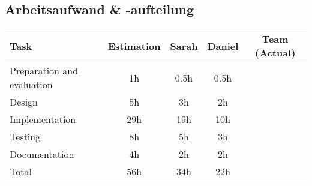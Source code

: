 \subsection{Arbeitsaufwand \& -aufteilung}
\begin{tabular} {| l | c | c | c | c |}
	\hline
	Task & Estimation & Sarah & Daniel & Team (Actual)	\\ \hline \hline
	Preparation and evaluation & 1h & 0.5h & 0.5h & 		\\ \hline
	Design & 5h & 3h &	2h & 			\\ \hline
	Implementation & 29h & 19h & 10h &  \\ \hline
	Testing & 8h & 5h	& 3h &  \\ \hline
	Documentation	& 4h & 2h & 2h & 	\\ \hline 
	Total	& 56h	& 34h & 22h &  \\
	\hline
\end{tabular}